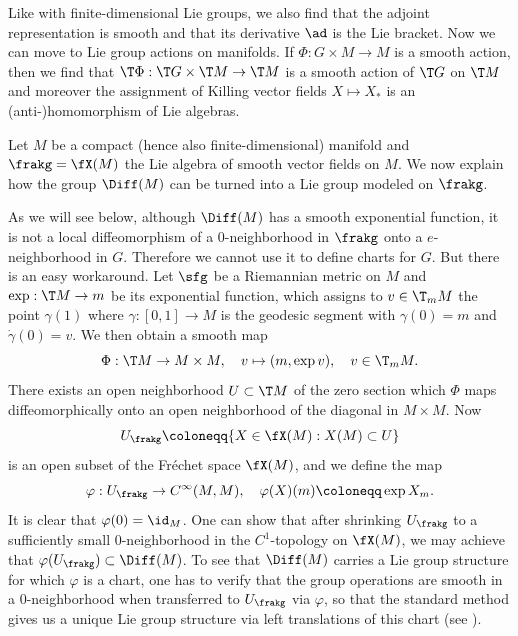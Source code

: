 Like with finite-dimensional Lie groups, we also find that the adjoint representation is smooth and that its derivative $\ad$ is the Lie bracket. Now we can move to Lie group actions on manifolds. If $\Phi:G\times M\to M$ is a smooth action, then we find that  $\T\Phi:\T G\times \T M\to \T M$ is a smooth action of $\T G$ on $\T M$ and moreover the assignment of Killing vector fields $X\mapsto X_\ast$ is an (anti-)homomorphism of Lie algebras.

\begin{example}
    Let $M$ be a compact (hence also finite-dimensional) manifold and $\frakg=\fX(M)$ the Lie algebra of smooth vector fields on $M$. We now explain how the group $\Diff(M)$ can be turned into a Lie group modeled on $\frakg$.

    
    As we will see below, although $\Diff(M)$ has a smooth exponential function, it is not a local diffeomorphism of a $0$-neighborhood in $\frakg$ onto a $e$-neighborhood in $G$. Therefore we cannot use it to define charts for $G$. But there is an easy workaround. Let $\sfg$ be a Riemannian metric on $M$ and $\exp:\T M\to m$ be its exponential function, which assigns to $v\in \T_mM$ the point $\gamma(1)$ where $\gamma:[0,1]\to M$ is the geodesic segment with $\gamma(0)=m$ and $\dot\gamma(0)=v$. We then obtain a smooth map
    \[\Phi:\T M\to M\times M,\quad v\mapsto (m,\exp v), \quad v\in \T_mM.\]
    There exists an open neighborhood $U\subset \T M$ of the zero section which $\Phi$ maps diffeomorphically onto an open neighborhood of the diagonal in $M\times M$. Now
    \[U_\frakg\coloneqq \{X\in \fX(M):X(M)\subset U\}\]
    is an open subset of the Fr\'echet space $\fX(M)$, and we define the map
    \[\varphi:U_\frakg\to C^\infty(M,M),\quad \varphi(X)(m)\coloneqq \exp X_m.\]
    It is clear that $\varphi(0)=\id_M$. One can show that after shrinking $U_\frakg$ to a sufficiently small $0$-neighborhood in the $C^1$-topology on $\fX(M)$, we may achieve that $\varphi(U_\frakg)\subset \Diff(M)$. To see that $\Diff(M)$ carries a Lie group structure for which $\varphi$ is a chart, one has to verify that the group operations are smooth in a $0$-neighborhood when transferred to $U_\frakg$ via $\varphi$, so that the standard method gives us a unique Lie group structure via left translations of this chart (see \cite[Thm.~9.4.4]{HN}). 
    

\end{example}

